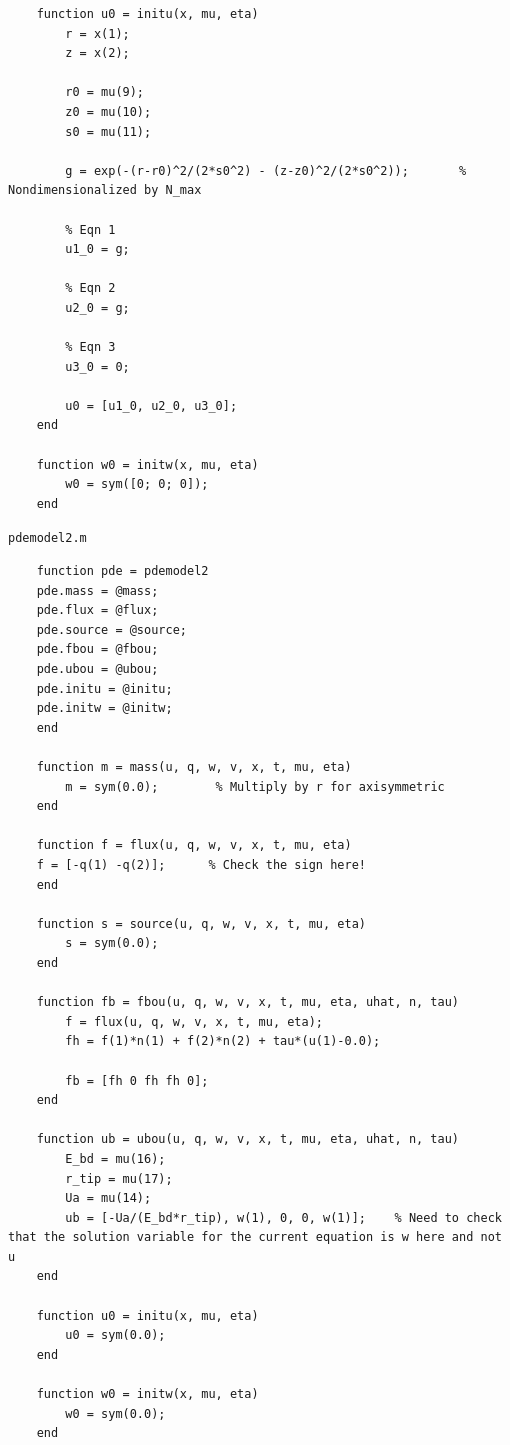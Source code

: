 \documentclass[12pt, a4paper]{report}
\begin{document}
\begin{lstlisting}
    function u0 = initu(x, mu, eta)
        r = x(1);
        z = x(2);
    
        r0 = mu(9);
        z0 = mu(10);
        s0 = mu(11);
    
        g = exp(-(r-r0)^2/(2*s0^2) - (z-z0)^2/(2*s0^2));       % Nondimensionalized by N_max
    
        % Eqn 1
        u1_0 = g;
    
        % Eqn 2
        u2_0 = g;
    
        % Eqn 3
        u3_0 = 0;
    
        u0 = [u1_0, u2_0, u3_0];
    end
    
    function w0 = initw(x, mu, eta)
        w0 = sym([0; 0; 0]);
    end    
\end{lstlisting}

\vspace{5mm}
\texttt{pdemodel2.m}
\begin{lstlisting}
    function pde = pdemodel2
    pde.mass = @mass;
    pde.flux = @flux;
    pde.source = @source;
    pde.fbou = @fbou;
    pde.ubou = @ubou;
    pde.initu = @initu;
    pde.initw = @initw;
    end
    
    function m = mass(u, q, w, v, x, t, mu, eta)
        m = sym(0.0);        % Multiply by r for axisymmetric
    end
    
    function f = flux(u, q, w, v, x, t, mu, eta)
    f = [-q(1) -q(2)];      % Check the sign here!
    end
    
    function s = source(u, q, w, v, x, t, mu, eta)
        s = sym(0.0);
    end
    
    function fb = fbou(u, q, w, v, x, t, mu, eta, uhat, n, tau)
        f = flux(u, q, w, v, x, t, mu, eta);
        fh = f(1)*n(1) + f(2)*n(2) + tau*(u(1)-0.0);
    
        fb = [fh 0 fh fh 0];
    end
    
    function ub = ubou(u, q, w, v, x, t, mu, eta, uhat, n, tau)
        E_bd = mu(16);
        r_tip = mu(17);
        Ua = mu(14);
        ub = [-Ua/(E_bd*r_tip), w(1), 0, 0, w(1)];    % Need to check that the solution variable for the current equation is w here and not u
    end
    
    function u0 = initu(x, mu, eta)
        u0 = sym(0.0);
    end
    
    function w0 = initw(x, mu, eta)
        w0 = sym(0.0);
    end    
\end{lstlisting}
\end{document}
